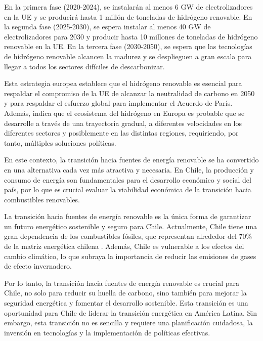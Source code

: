 \newpage

En la primera fase (2020-2024), se instalarán al menos 6 GW de electrolizadores en la UE y se producirá hasta 1 millón de toneladas de hidrógeno renovable. En la segunda fase (2025-2030), se espera instalar al menos 40 GW de electrolizadores para 2030 y producir hasta 10 millones de toneladas de hidrógeno renovable en la UE. En la tercera fase (2030-2050), se espera que las tecnologías de hidrógeno renovable alcancen la madurez y se desplieguen a gran escala para llegar a todos los sectores difíciles de descarbonizar.
\vspace{2.5mm}

 Esta estrategia europea establece que el hidrógeno renovable es esencial para respaldar el compromiso de la UE de alcanzar la neutralidad de carbono en 2050 y para respaldar el esfuerzo global para implementar el Acuerdo de París. Además, indica que el ecosistema del hidrógeno en Europa es probable que se desarrolle a través de una trayectoria gradual, a diferentes velocidades en los diferentes sectores y posiblemente en las distintas regiones, requiriendo, por tanto, múltiples soluciones políticas.
\vspace{2.5mm}

En este contexto, la transición hacia fuentes de energía renovable se ha convertido en una alternativa cada vez más atractiva y necesaria. En Chile, la producción y consumo de energía son fundamentales para el desarrollo económico y social del país, por lo que es crucial evaluar la viabilidad económica de la transición hacia combustibles renovables.
\vspace{2.5mm}

La transición hacia fuentes de energía renovable es la única forma de garantizar un futuro energético sostenible y seguro para Chile. Actualmente, Chile tiene una gran dependencia de los combustibles fósiles, que representan alrededor del 70\% de la matriz energética chilena . Además, Chile es vulnerable a los efectos del cambio climático, lo que subraya la importancia de reducir las emisiones de gases de efecto invernadero.
\vspace{2.5mm}

Por lo tanto, la transición hacia fuentes de energía renovable es crucial para Chile, no solo para reducir su huella de carbono, sino también para mejorar la seguridad energética y fomentar el desarrollo sostenible. Esta transición es una oportunidad para Chile de liderar la transición energética en América Latina. Sin embargo, esta transición no es sencilla y requiere una planificación cuidadosa, la inversión en tecnologías y la implementación de políticas efectivas.
\vspace{2.5mm}

